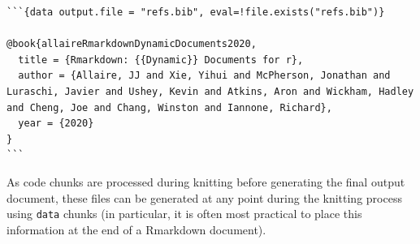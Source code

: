 \begin{verbatim}
```{data output.file = "refs.bib", eval=!file.exists("refs.bib")}

@book{allaireRmarkdownDynamicDocuments2020,
  title = {Rmarkdown: {{Dynamic}} Documents for r},
  author = {Allaire, JJ and Xie, Yihui and McPherson, Jonathan and Luraschi, Javier and Ushey, Kevin and Atkins, Aron and Wickham, Hadley and Cheng, Joe and Chang, Winston and Iannone, Richard},
  year = {2020}
}
```
\end{verbatim}

As code chunks are processed during knitting before generating the final output document, these files can be generated at any point during the knitting process using \texttt{data} chunks (in particular, it is often most practical to place this information at the end of a Rmarkdown document).

